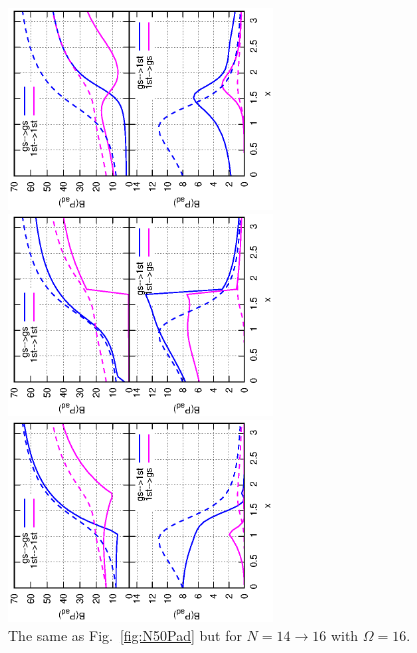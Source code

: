 \documentclass[%
superscriptaddress,
preprint,
showpacs,
nofootinbib,
amsmath,amssymb,
aps,
prc,
floatfix ]%
{revtex4-1}
\begin{document}
\begin{figure}[htbp]
 \begin{minipage}{0.3\hsize}
 \begin{center}
  \includegraphics[width=70mm,angle=-90]{images/N16Pad_CQ.eps}
 \end{center}
 \captionsetup{labelformat=empty,labelsep=none}
 \end{minipage}
 \begin{minipage}{0.3\hsize}
 \begin{center}
  \includegraphics[width=70mm,angle=-90]{images/N16Pad_FD.eps}
 \end{center}
 \captionsetup{labelformat=empty,labelsep=none}
 \end{minipage}
 \begin{minipage}{0.3\hsize}
 \begin{center}
  \includegraphics[width=70mm,angle=-90]{images/N16Pad_SPA.eps}
 \end{center}
 \captionsetup{labelformat=empty,labelsep=none}
 \end{minipage}
	\caption{The same as Fig.~\ref{fig:N50Pad} but for $N=14\rightarrow 16$
	with $\Omega=16$.
}
 \label{fig:N16Pad}
\end{figure}
\end{document}
